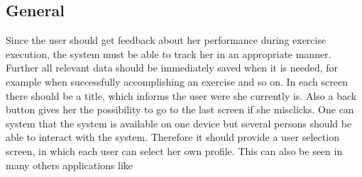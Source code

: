 \subsection{General}
Since the user should get feedback about her performance during exercise execution, the system must be able to track her in an appropriate manner. Further all relevant data should be immediately saved when it is needed, for example when successfully accomplishing an exercise and so on. %
In each screen there should be a title, which informs the user were she currently is. Also a back button gives her the possibility to go to the last screen if she misclicks. One can system that the system is available on one device but several persons should be able to interact with the system. Therefore it should provide a user selection screen, in which each user can select her own profile. This can also be seen in many others applications like \todo{[CITE]}

